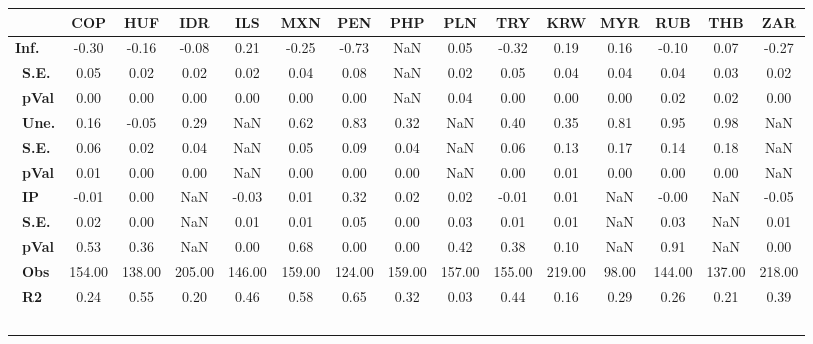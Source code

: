 \begin{tabular}{l|cccccccccccccc}
\hline
&\textbf{COP}&\textbf{HUF}&\textbf{IDR}&\textbf{ILS}&\textbf{MXN}&\textbf{PEN}&\textbf{PHP}&\textbf{PLN}&\textbf{TRY}&\textbf{KRW}&\textbf{MYR}&\textbf{RUB}&\textbf{THB}&\textbf{ZAR}\\\hline
\textbf{Inf.}&-0.30&-0.16&-0.08&0.21&-0.25&-0.73&NaN&0.05&-0.32&0.19&0.16&-0.10&0.07&-0.27\\\
\textbf{S.E.}&0.05&0.02&0.02&0.02&0.04&0.08&NaN&0.02&0.05&0.04&0.04&0.04&0.03&0.02\\\
\textbf{pVal}&0.00&0.00&0.00&0.00&0.00&0.00&NaN&0.04&0.00&0.00&0.00&0.02&0.02&0.00\\\
\textbf{Une.}&0.16&-0.05&0.29&NaN&0.62&0.83&0.32&NaN&0.40&0.35&0.81&0.95&0.98&NaN\\\
\textbf{S.E.}&0.06&0.02&0.04&NaN&0.05&0.09&0.04&NaN&0.06&0.13&0.17&0.14&0.18&NaN\\\
\textbf{pVal}&0.01&0.00&0.00&NaN&0.00&0.00&0.00&NaN&0.00&0.01&0.00&0.00&0.00&NaN\\\
\textbf{IP}&-0.01&0.00&NaN&-0.03&0.01&0.32&0.02&0.02&-0.01&0.01&NaN&-0.00&NaN&-0.05\\\
\textbf{S.E.}&0.02&0.00&NaN&0.01&0.01&0.05&0.00&0.03&0.01&0.01&NaN&0.03&NaN&0.01\\\
\textbf{pVal}&0.53&0.36&NaN&0.00&0.68&0.00&0.00&0.42&0.38&0.10&NaN&0.91&NaN&0.00\\\
\textbf{Obs}&154.00&138.00&205.00&146.00&159.00&124.00&159.00&157.00&155.00&219.00&98.00&144.00&137.00&218.00\\\
\textbf{R2}&0.24&0.55&0.20&0.46&0.58&0.65&0.32&0.03&0.44&0.16&0.29&0.26&0.21&0.39\\\
\end{tabular}
